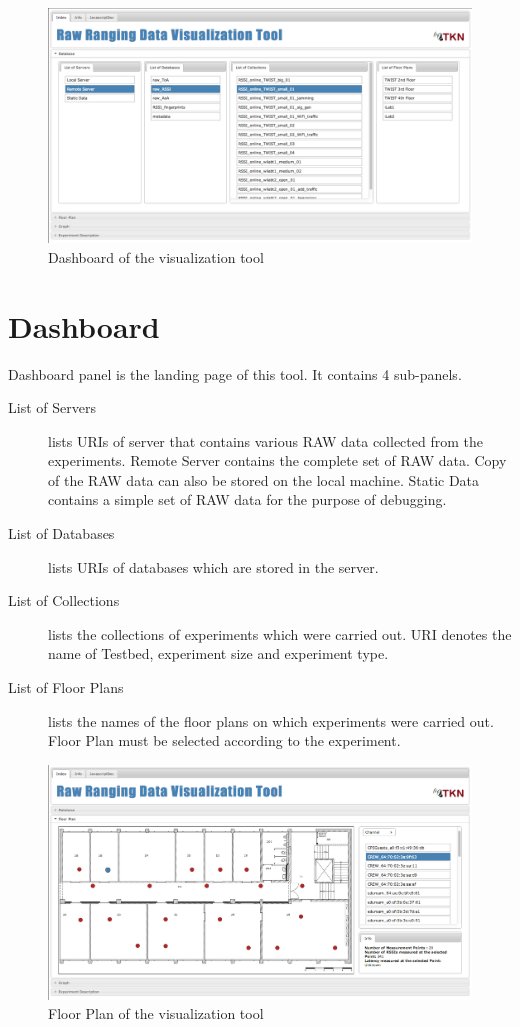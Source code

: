 \documentclass[11pt,a4paper,headinclude,footinclude,chapterprefix=on]{scrreprt}
\begin{document}
\begin{figure}
	[!h] \centering 
	\includegraphics[width=15cm]{Images/tool_db.png} \caption{Dashboard of the visualization tool} \label{fig:tool:db} 
\end{figure}
 
\section{Dashboard} 
Dashboard panel is the landing page of this tool. It contains 4 sub-panels. 

\begin{description}
\item[List of Servers] lists URIs of server that contains various RAW data collected from the experiments. Remote Server contains the complete set of RAW data. Copy of the RAW data can also be stored on the local machine. Static Data contains a simple set of RAW data for the purpose of debugging. 
\item[List of Databases] lists URIs of databases which are stored in the server. 
\item[List of Collections] lists the collections of experiments which were carried out. URI denotes the name of Testbed, experiment size and experiment type.
\item[List of Floor Plans] lists the names of the floor plans on which experiments were carried out. Floor Plan must be selected according to the experiment. 
\end{description}

\begin{figure}
	[!h] \centering 
	\includegraphics[width=15cm]{Images/tool_floor.png} \caption{Floor Plan of the visualization tool} \label{fig:tool:floor} 
\end{figure}
\end{document}

